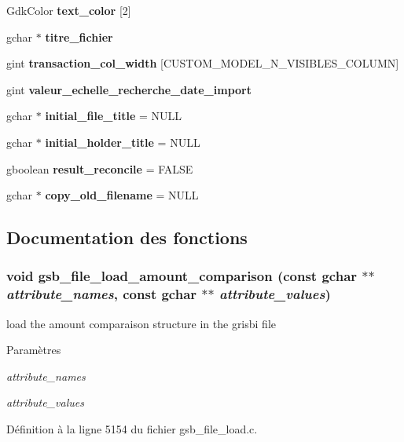 \begin{DoxyCompactItemize}
\item 
GdkColor {\bf text\_\-color} [2]
\item 
gchar $\ast$ {\bf titre\_\-fichier}
\item 
gint {\bf transaction\_\-col\_\-width} [CUSTOM\_\-MODEL\_\-N\_\-VISIBLES\_\-COLUMN]
\item 
gint {\bf valeur\_\-echelle\_\-recherche\_\-date\_\-import}
\item 
gchar $\ast$ {\bf initial\_\-file\_\-title} = NULL
\item 
gchar $\ast$ {\bf initial\_\-holder\_\-title} = NULL
\item 
gboolean {\bf result\_\-reconcile} = FALSE
\item 
gchar $\ast$ {\bf copy\_\-old\_\-filename} = NULL
\end{DoxyCompactItemize}


\subsection{Documentation des fonctions}
\subsubsection[{gsb\_\-file\_\-load\_\-amount\_\-comparison}]{\setlength{\rightskip}{0pt plus 5cm}void gsb\_\-file\_\-load\_\-amount\_\-comparison (const gchar $\ast$$\ast$ {\em attribute\_\-names}, \/  const gchar $\ast$$\ast$ {\em attribute\_\-values})}\label{gsb__file__load_8c_a341cc9d8b903c0ab9ecd89bb40fcbae4}
load the amount comparaison structure in the grisbi file


\begin{DoxyParams}{Paramètres}
\item[{\em attribute\_\-names}]\item[{\em attribute\_\-values}]\end{DoxyParams}


Définition à la ligne 5154 du fichier gsb\_\-file\_\-load.c.

